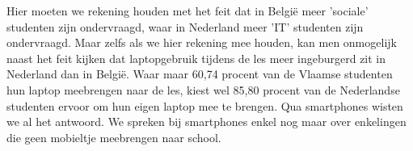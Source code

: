 \begin{table}[]
	\centering
	\caption{Verschillen in gebruik tussen België en Nederland}
	\label{belg-nederlander}
\end{table}

Hier moeten we rekening houden met het feit dat in België meer 'sociale' studenten zijn ondervraagd, waar in Nederland meer 'IT' studenten zijn ondervraagd. Maar zelfs als we hier rekening mee houden, kan men onmogelijk naast het feit kijken dat laptopgebruik tijdens de les meer ingeburgerd zit in Nederland dan in België. Waar maar 60,74 procent van de Vlaamse studenten hun laptop meebrengen naar de les, kiest wel 85,80 procent van de Nederlandse studenten ervoor om hun eigen laptop mee te brengen. Qua smartphones wisten we al het antwoord. We spreken bij smartphones enkel nog maar over enkelingen die geen mobieltje meebrengen naar school.

